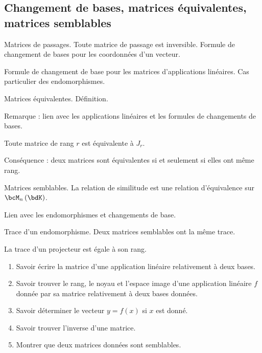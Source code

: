 \documentclass[a4paper,french,bookmarks]{article}
\begin{document}
\subsection*{Changement de bases, matrices équivalentes, matrices semblables}

\begin{enumerate}
    \ithand Matrices de passages. Toute matrice de passage est inversible. Formule de changement de bases pour les coordonnées d'un vecteur.
    
    \ithand Formule de changement de base pour les matrices d'applications linéaires. Cas particulier des endomorphismes.
    
    \ithand Matrices équivalentes. Définition. 
    
    Remarque : lien avec les applications linéaires et les formules de changements de bases. 
    
    Toute matrice de rang $r$ est équivalente à $J_r$. 
    
    Conséquence : deux matrices sont équivalentes si et seulement si elles ont même rang.
    
    \ithand Matrices semblables. La relation de similitude est une relation d'équivalence sur $\bcM_n\left(\bdK\right)$.
    
    Lien avec les endomorphismes et changements de base.
    
    \ithand Trace d'un endomorphisme. Deux matrices semblables ont la même trace.
    
    La trace d'un projecteur est égale à son rang.
\end{enumerate}

\savoirfaire

\begin{enumerate}
    \item Savoir écrire la matrice d'une application linéaire relativement à deux bases.
    
    \item Savoir trouver le rang, le noyau et l'espace image d'une application linéaire $f$ donnée par sa matrice relativement à deux bases données.
    
    \item Savoir déterminer le vecteur $y = f\left(x\right)$ si $x$ est donné.
    
    \item Savoir trouver l'inverse d'une matrice.
    
    \item Montrer que deux matrices données sont semblables.
\end{enumerate}
\end{document}
